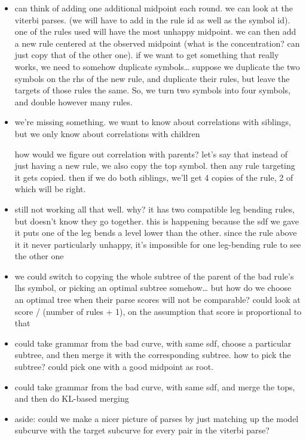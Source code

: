 \documentclass{book}
\begin{document}
\begin{itemize}
\item can think of adding one additional midpoint each round. we can
    look at the viterbi parses. (we will have to add in the rule id as
    well as the symbol id). one of the rules used will have the most
    unhappy midpoint. we can then add a new rule centered at the
    observed midpoint (what is the concentration? can just copy that
    of the other one). if we want to get something that really works,
    we need to somehow duplicate symbols\ldots{} suppose we duplicate the
    two symbols on the rhs of the new rule, and duplicate their rules,
    but leave the targets of those rules the same. So, we turn two
    symbols into four symbols, and double however many rules.
\item we're missing something. we want to know about correlations with
    siblings, but we only know about correlations with children

    how would we figure out correlation with parents? let's say that
    instead of just having a new rule, we also copy the top
    symbol. then any rule targeting it gets copied. then if we do both
    siblings, we'll get 4 copies of the rule, 2 of which will be right.
\item still not working all that well. why? it has two compatible leg
    bending rules, but doesn't know they go together. this is
    happening because the sdf we gave it puts one of the leg bends a
    level lower than the other. since the rule above it it never
    particularly unhappy, it's impossible for one leg-bending rule to
    see the other one
\item we could switch to copying the whole subtree of the parent of the
    bad rule's lhs symbol, or picking an optimal subtree
    somehow\ldots{} but how do we choose an optimal tree when their parse
    scores will not be comparable? could look at score / (number of
    rules + 1), on the assumption that score is proportional to that
\item could take grammar from the bad curve, with same sdf, choose a
    particular subtree, and then merge it with the corresponding
    subtree. how to pick the subtree? could pick one with a good
    midpoint as root.
\item could take grammar from the bad curve, with same sdf, and merge
    the tops, and then do KL-based merging
\item aside: could we make a nicer picture of parses by just matching up
    the model subcurve with the target subcurve for every pair in the
    viterbi parse?
\end{itemize}
\end{document}
